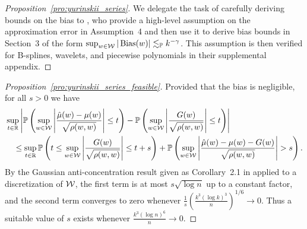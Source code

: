 \begin{proof}[Proposition~\ref{pro:yurinskii_series}]

  We delegate the task of carefully deriving bounds on the bias to
  \citet{cattaneo2020large}, who provide a high-level assumption on the
  approximation error in Assumption~4 and then use it to derive bias bounds in
  Section~3 of the form $\sup_{w \in \mathcal{W}} |\operatorname{Bias}(w)| \lesssim_{\mathbb{P}} k^{-\gamma}$.
  This assumption is then verified for B-splines, wavelets, and piecewise
  polynomials in their supplemental appendix.

\end{proof}

\begin{proof}[Proposition~\ref{pro:yurinskii_series_feasible}]

  Provided that the bias is negligible,
  for all $s > 0$ we have
  \begin{align*}
    &\sup_{t \in \mathbb{R}}
    \left|
    \mathbb{P}\left(
      \sup_{w \in \mathcal{W}}
      \left|
      \frac{\hat\mu(w)-\mu(w)}{\sqrt{\rho(w,w)}}
      \right| \leq t
    \right)
    -
    \mathbb{P}\left(
      \sup_{w \in \mathcal{W}}
      \left|
      \frac{G(w)}{\sqrt{\rho(w,w)}}
      \right| \leq t
    \right)
    \right| \\
    &\quad\leq
    \sup_{t \in \mathbb{R}}
    \mathbb{P}\left(
      t \leq
      \sup_{w \in \mathcal{W}}
      \left|
      \frac{G(w)}{\sqrt{\rho(w,w)}}
      \right|
      \leq t + s
    \right)
    +
    \mathbb{P}\left(
      \sup_{w \in \mathcal{W}}
      \left|
      \frac{\hat\mu(w)-\mu(w)-G(w)}{\sqrt{\rho(w,w)}}
      \right| > s
    \right).
  \end{align*}
  By the Gaussian anti-concentration result given as Corollary~2.1 in
  \citet{chernozhukov2014anti} applied to a discretization of $\mathcal{W}$, the first
  term is at most $s \sqrt{\log n}$ up to a constant factor, and the second
  term converges to zero whenever
  $\frac{1}{s} \left( \frac{k^3 (\log k)^3}{n} \right)^{1/6} \to 0$.
  Thus a suitable value of $s$ exists whenever $\frac{k^3(\log n)^6}{n} \to 0$.



\end{proof}
